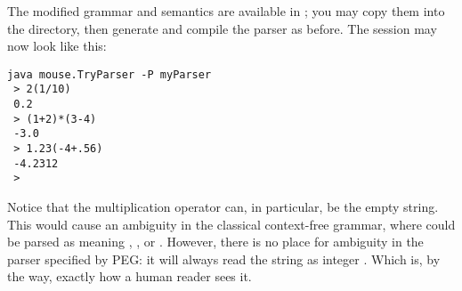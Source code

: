 The modified grammar and semantics are available in ;
you may copy them 
into the  directory,
then generate and compile the parser as before.
The session may now look like this:

\small
\begin{Verbatim}[samepage=true,xleftmargin=15mm,baselinestretch=0.8]
 java mouse.TryParser -P myParser
 > 2(1/10)
 0.2
 > (1+2)*(3-4)
 -3.0
 > 1.23(-4+.56)
 -4.2312
 >
\end{Verbatim}
\normalsize

Notice that the multiplication operator can, in particular, be the empty string.
This would cause an ambiguity in the classical context-free grammar,
where  could be parsed as meaning , , or .
However, there is no place for ambiguity in the parser specified by PEG:
it will always read the string as integer .
Which is, by the way, exactly how a human reader sees it.

